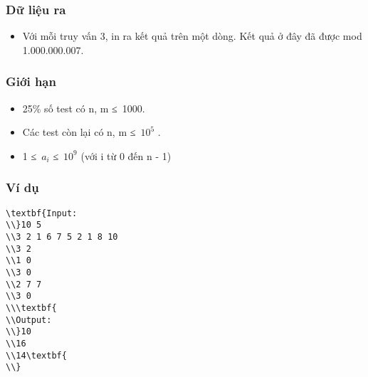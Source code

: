 \subsubsection{   Dữ liệu ra  }
\begin{itemize}
	\item     Với mỗi truy vấn 3, in ra kết quả trên một dòng. Kết quả ở đây đã được mod 1.000.000.007.   
\end{itemize}

\subsubsection{   Giới hạn  }
\begin{itemize}
	\item     25\% số test có n, m ≤ 1000.   
	\item     Các test còn lại có n, m ≤ $10^{5}$    .   
	\item     1 ≤ $a_{i}$    ≤ $10^{9}$    (với i từ 0 đến n - 1)   
\end{itemize}

\subsubsection{   Ví dụ  }
\begin{verbatim}
\textbf{Input:
\\}10 5
\\3 2 1 6 7 5 2 1 8 10
\\3 2
\\1 0
\\3 0
\\2 7 7
\\3 0
\\\textbf{
\\Output:
\\}10
\\16
\\14\textbf{
\\}\end{verbatim}

